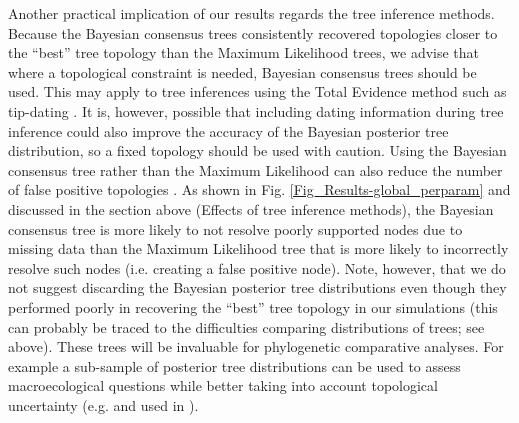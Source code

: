 Another practical implication of our results regards the tree inference methods.
Because the Bayesian consensus trees consistently recovered topologies closer to the ``best'' tree topology than the Maximum Likelihood trees, we advise that where a topological constraint is needed, Bayesian consensus trees should be used.
This may apply to tree inferences using the Total Evidence method such as tip-dating \citep[e.g.][]{ronquista2012,Wood01032013,BEASTmaster}.
It is, however, possible that including dating information during tree inference could also improve the accuracy of the Bayesian posterior tree distribution, so a fixed topology should be used with caution.
Using the Bayesian consensus tree rather than the Maximum Likelihood can also reduce the number of false positive topologies \citep[\textit{sensu}][]{Swofford2001}.
As shown in Fig. \ref{Fig_Results-global_perparam} and discussed in the section above (Effects of tree inference methods), the Bayesian consensus tree is more likely to not resolve poorly supported nodes due to missing data than the Maximum Likelihood tree that is more likely to incorrectly resolve such nodes (i.e. creating a false positive node).
Note, however, that we do not suggest discarding the Bayesian posterior tree distributions even though they performed poorly in recovering the ``best'' tree topology in our simulations (this can probably be traced to the difficulties comparing distributions of trees; see above).
These trees will be invaluable for phylogenetic comparative analyses.
For example a sub-sample of posterior tree distributions can be used to assess macroecological questions while better taking into account topological uncertainty (e.g. \citealt{fritzdiversity2013} and \citealt{jetzthe2012} used in \citealt{healy2014}).

